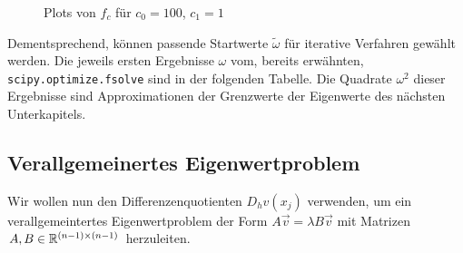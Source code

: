 \begin{figure}[H]
  \centering
  \hspace{0mm}
  \caption{Plots von $f_c$ für $c_0 = 100$, $c_1 = 1$}
  \label{fig:zero_function}
\end{figure}

Dementsprechend, können passende Startwerte $\tilde \omega$ für iterative Verfahren gewählt werden. Die jeweils ersten Ergebnisse $\omega$ vom, bereits erwähnten, \verb|scipy.optimize.fsolve| sind in der folgenden Tabelle. Die Quadrate $\omega^2$ dieser Ergebnisse sind Approximationen der Grenzwerte der Eigenwerte des nächsten Unterkapitels. \\


\vspace{10pt}

\subsection{Verallgemeinertes Eigenwertproblem}

Wir wollen nun den Differenzenquotienten $D_h v(x_j)$ verwenden, um ein verallgemeintertes Eigenwertproblem der Form $A \vec v = \lambda B \vec v$ mit Matrizen $A, B \in \mathbb{R}^{(n-1) \times (n-1)}$ herzuleiten. \\

